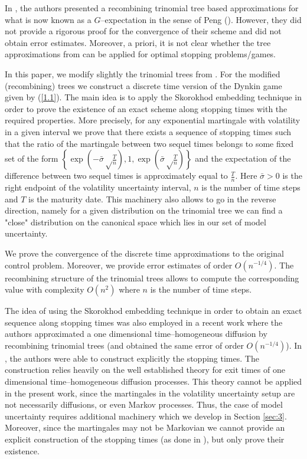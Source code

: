 \documentclass{amsart}
\numberwithin{equation}{section}
\begin{document}
In \cite{ALP}, the authors presented a recombining trinomial tree based
approximations for what is now known as a $G$--expectation in the sense of Peng (\cite{P}).
However, they did not provide a rigorous proof
for the convergence of their scheme and did not obtain error estimates.
Moreover, a priori, it is not clear whether the tree approximations from \cite{ALP}
can be applied for optimal stopping problems/games.

In this paper, we modify slightly the trinomial trees from \cite{ALP}. For the modified (recombining) trees
we construct a discrete time version of the Dynkin game given by (\ref{1.1}).
The main idea is to apply the Skorokhod embedding technique
in order to prove the existence of an
exact scheme along stopping times with the required properties. More precisely, for any
exponential martingale with volatility
in a given interval we prove that there exists
a sequence
of stopping times such that the ratio of the martingale between two sequel times
belongs to some fixed set of the form
$\left\{\exp\left(-\bar\sigma\sqrt\frac{T}{n}\right),1,\exp\left(\bar\sigma\sqrt\frac{T}{n}\right)\right\}$
and the expectation of the
difference between two sequel times is approximately equal to $\frac{T}{n}$.
Here $\bar\sigma>0$ is the right endpoint of the volatility uncertainty interval, $n$ is the number of time steps
and $T$ is the maturity date. This machinery also allows to go in the reverse direction,
namely for a given distribution on the trinomial tree
we can find a "close" distribution on the canonical space which lies in our set of model uncertainty.

We prove the convergence of the
discrete time approximations to the original control problem. Moreover, we provide
error estimates of order $O(n^{-1/4})$.
The recombining structure
of the trinomial trees allows to compute
the corresponding value with complexity $O(n^2)$ where $n$ is the number of time steps.

The idea of
using the Skorokhod embedding technique
in order to obtain an
exact sequence along stopping times
was also employed in a recent work \cite{BDG} where the authors approximated a one dimensional time--homogeneous
diffusion
by recombining trinomial trees (and obtained the same error of order $O(n^{-1/4})$).
In \cite{BDG}, the authors were able to construct explicitly the stopping times. The construction relies heavily on the
well established theory for exit times of one dimensional time--homogeneous
diffusion processes.
This theory cannot be applied in the present work, since the martingales in the volatility uncertainty
setup are not
necessarily diffusions, or even Markov processes.
Thus, the case of model uncertainty requires additional machinery which we develop in
Section \ref{sec:3}. Moreover, since the martingales may not be Markovian we cannot provide an explicit construction of the stopping times
(as done in \cite{BDG}),
but only prove their existence.
\end{document}
